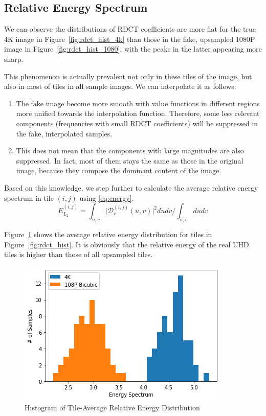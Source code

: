 \documentclass[journal,conference]{IEEEtran}
\begin{document}
\subsection{Relative Energy Spectrum}
We can observe the distributions of RDCT coefficients are more flat for the true 4K image in Figure~\ref{fig:rdct_hist_4k} than those in the fake, upsampled 1080P image in Figure~\ref{fig:rdct_hist_1080}, with the peaks in the latter appearing more sharp.

This phenomenon is actually prevalent not only in these tiles of the image, but also in most of tiles in all sample images.
We can interpolate it as follows:\begin{enumerate}
	\item The fake image become more smooth with value functions in different regions more unified towards the interpolation function. Therefore, some less relevant components (frequencies with small RDCT coefficients) will be suppressed in the fake, interpolated samples.
	\item This does not mean that the components with large magnitudes are also suppressed. In fact, most of them stays the same as those in the original image, because they compose the dominant content of the image.
\end{enumerate}

Based on this knowledge, we step further to calculate the average relative energy spectrum in tile $(i, j)$ using \eqref{eq:energy}.
\begin{equation}
	E_{L_2}^{(i, j)} = \int_{u,v} \big|\mathcal{D}_r^{(i, j)}(u, v)\big|^2 dudv \Big/ \int_{u,v} dudv
	\label{eq:energy}
\end{equation}

Figure~\ref{fig:ave-energy-hist} shows the average relative energy distribution for tiles in Figure~\ref{fig:rdct_hist}.
It is obviously that the relative energy of the real UHD tiles is higher than those of all upsampled tiles.

\begin{figure}[h]
	\centering
	\includegraphics[width=0.99\linewidth]{fig/rel_energy_4k_1080.png}
	\caption{Histogram of Tile-Average Relative Energy Distribution}
	\label{fig:ave-energy-hist}
\end{figure}
\end{document}

